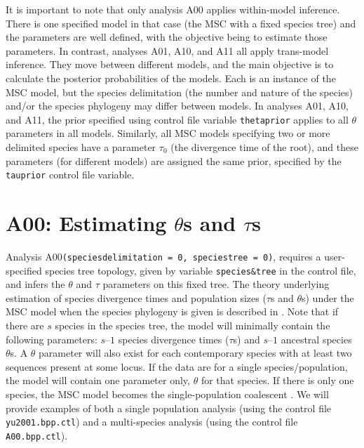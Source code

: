 \documentclass[a4paper]{book}
\numberwithin{equation}{section} \renewcommand{\baselinestretch}{0.55}
\begin{document}
 It is important to note that only analysis A00 applies within-model inference.
 There is one specified model in that case (the MSC with a fixed species tree)
 and the parameters are well defined, with the objective being to estimate those
 parameters.  In contrast, analyses A01, A10, and A11 all apply trans-model
inference. They move between different models, and the main objective
is to calculate the posterior probabilities of the models.  Each is an
instance of the MSC model, but the species delimitation (the number and
nature of the species) and/or the species phylogeny may differ between models.
In analyses A01, A10, and A11, the prior specified using control file variable
\texttt{thetaprior} applies to all $\theta$ parameters in all models.
Similarly, all MSC models specifying two or more delimited species have a
parameter $\tau_0$ (the divergence time of the root), and these
parameters (for different models) are assigned the same prior,
specified by the \texttt{tauprior} control file variable.

 
 \section{A00: Estimating $\theta$s and $\tau$s} \label{a00} Analysis
 A00\texttt{(speciesdelimitation = 0, speciestree = 0)}, requires a
 user-specified species tree topology, given by variable
 \texttt{species\&tree} in the control file, and infers the $\theta$
 and $\tau$ parameters on this fixed tree.  The theory underlying
 estimation of species divergence times and population sizes ($\tau$s
 and $\theta$s) under the MSC model when the species phylogeny is
 given is described in \citep{Rannala2003}.  Note that if there are
 $s$ species in the species tree, the model will minimally contain the
 following parameters: $s – 1$ species divergence times ($\tau$s) and
 $s – 1$ ancestral species $\theta$s.  A $\theta$ parameter will also
 exist for each contemporary species with at least two sequences
 present at some locus. If the data are for a single
 species/population, the model will contain one parameter only,
 $\theta$ for that species. If there is only one species, the MSC
 model becomes the single-population coalescent
 \citep{Kingman1982}. We will provide examples of both a single
 population analysis (using the control file \texttt{yu2001.bpp.ctl})
 and a multi-species analysis (using the control file
 \texttt{A00.bpp.ctl}).
\end{document}
